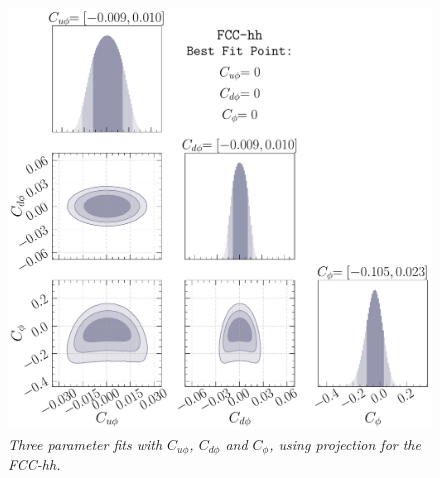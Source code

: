 \FloatBarrier
\begin{figure}[t!]
	\centering
	\includegraphics[width =0.75\linewidth]{fig/kappa_u-kappa_d-kappa_l-FCC-hh.pdf}
	\caption{\it Three parameter fits with $C_{u\phi}$, $C_{d\phi}$ and $C_\phi$, using projection for the FCC-hh.}
	\label{fig:constraint3dfcc}
\end{figure}
